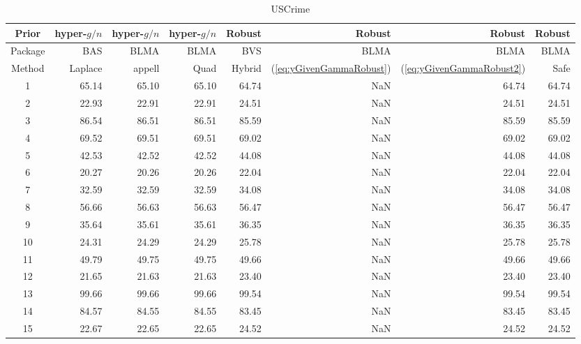 \documentclass{article}[12pt]
\begin{document}
\begin{table}[ht]
	\centering
		{\small 
	\begin{tabular}{c|rrr|rrrr}
		Prior   & hyper-$g/n$ & hyper-$g/n$ & hyper-$g/n$ & Robust &  Robust & Robust & Robust \\		
		\hline
		Package & BAS         & BLMA        & BLMA        & BVS & BLMA & BLMA & BLMA  \\
		\hline 
		Method  & Laplace     & appell      & Quad  & Hybrid & (\ref{eq:yGivenGammaRobust}) & (\ref{eq:yGivenGammaRobust2}) & Safe \\ 
		\hline
		1 & 65.14 & 65.10 & 65.10 & 64.74 & NaN & 64.74 & 64.74 \\ 
		2 & 22.93 & 22.91 & 22.91 & 24.51 & NaN & 24.51 & 24.51 \\ 
		3 & 86.54 & 86.51 & 86.51 & 85.59 & NaN & 85.59 & 85.59 \\ 
		4 & 69.52 & 69.51 & 69.51 & 69.02 & NaN & 69.02 & 69.02 \\ 
		5 & 42.53 & 42.52 & 42.52 & 44.08 & NaN & 44.08 & 44.08 \\ 
		6 & 20.27 & 20.26 & 20.26 & 22.04 & NaN & 22.04 & 22.04 \\ 
		7 & 32.59 & 32.59 & 32.59 & 34.08 & NaN & 34.08 & 34.08 \\ 
		8 & 56.66 & 56.63 & 56.63 & 56.47 & NaN & 56.47 & 56.47 \\ 
		9 & 35.64 & 35.61 & 35.61 & 36.35 & NaN & 36.35 & 36.35 \\ 
		10 & 24.31 & 24.29 & 24.29 & 25.78 &NaN  & 25.78 & 25.78 \\ 
		11 & 49.79 & 49.75 & 49.75 & 49.66 & NaN & 49.66 & 49.66 \\ 
		12 & 21.65 & 21.63 & 21.63 & 23.40 & NaN & 23.40 & 23.40 \\ 
		13 & 99.66 & 99.66 & 99.66 & 99.54 & NaN & 99.54 & 99.54 \\ 
		14 & 84.57 & 84.55 & 84.55 & 83.45 & NaN & 83.45 & 83.45 \\ 
		15 & 22.67 & 22.65 & 22.65 & 24.52 & NaN & 24.52 & 24.52 \\ 
		\hline
	\end{tabular}
}
	\caption{USCrime}
	\label{tab:USCrimeResults2}
\end{table} 
\end{document}
